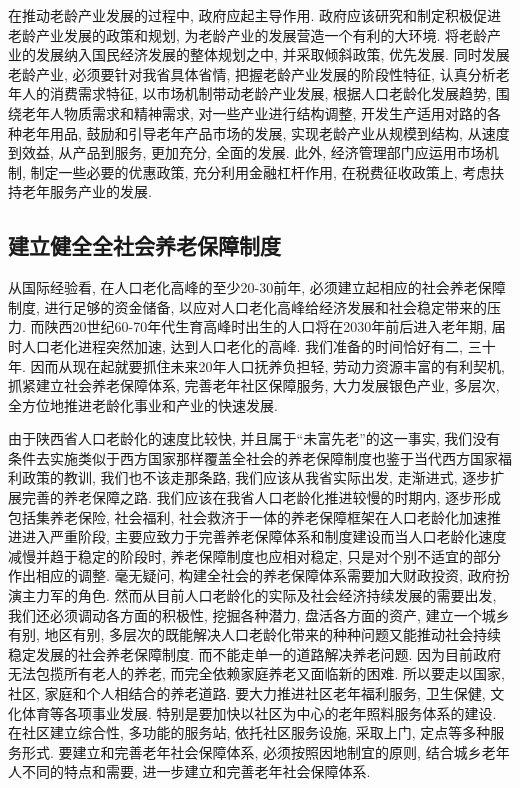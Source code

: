\documentclass[a4paper, 12pt, UTF8]{article}
\begin{document}
在推动老龄产业发展的过程中, 政府应起主导作用. 政府应该研究和制定积极促进老龄产业发展的政策和规划, 为老龄产业的发展营造一个有利的大环境. 将老龄产业的发展纳入国民经济发展的整体规划之中, 并采取倾斜政策, 优先发展. 同时发展老龄产业, 必须要针对我省具体省情, 把握老龄产业发展的阶段性特征, 认真分析老年人的消费需求特征, 以市场机制带动老龄产业发展, 根据人口老龄化发展趋势, 围绕老年人物质需求和精神需求, 对一些产业进行结构调整, 开发生产适用对路的各种老年用品, 鼓励和引导老年产品市场的发展, 实现老龄产业从规模到结构, 从速度到效益, 从产品到服务, 更加充分, 全面的发展. 此外, 经济管理部门应运用市场机制, 制定一些必要的优惠政策, 充分利用金融杠杆作用, 在税费征收政策上, 考虑扶持老年服务产业的发展.

\subsection{建立健全全社会养老保障制度}
从国际经验看, 在人口老化高峰的至少20-30前年, 必须建立起相应的社会养老保障制度, 进行足够的资金储备, 以应对人口老化高峰给经济发展和社会稳定带来的压力. 而陕西20世纪60-70年代生育高峰时出生的人口将在2030年前后进入老年期, 届时人口老化进程突然加速, 达到人口老化的高峰. 我们准备的时间恰好有二, 三十年. 因而从现在起就要抓住未来20年人口抚养负担轻, 劳动力资源丰富的有利契机, 抓紧建立社会养老保障体系, 完善老年社区保障服务, 大力发展银色产业, 多层次, 全方位地推进老龄化事业和产业的快速发展. 

由于陕西省人口老龄化的速度比较快, 并且属于“未富先老”的这一事实, 我们没有条件去实施类似于西方国家那样覆盖全社会的养老保障制度也鉴于当代西方国家福利政策的教训, 我们也不该走那条路, 我们应该从我省实际出发, 走渐进式, 逐步扩展完善的养老保障之路. 我们应该在我省人口老龄化推进较慢的时期内, 逐步形成包括集养老保险, 社会福利, 社会救济于一体的养老保障框架在人口老龄化加速推进进入严重阶段, 主要应致力于完善养老保障体系和制度建设而当人口老龄化速度减慢并趋于稳定的阶段时, 养老保障制度也应相对稳定, 只是对个别不适宜的部分作出相应的调整. 毫无疑问, 构建全社会的养老保障体系需要加大财政投资, 政府扮演主力军的角色. 然而从目前人口老龄化的实际及社会经济持续发展的需要出发, 我们还必须调动各方面的积极性, 挖掘各种潜力, 盘活各方面的资产, 建立一个城乡有别, 地区有别, 多层次的既能解决人口老龄化带来的种种问题又能推动社会持续稳定发展的社会养老保障制度. 而不能走单一的道路解决养老问题. 因为目前政府无法包揽所有老人的养老, 而完全依赖家庭养老又面临新的困难. 所以要走以国家, 社区, 家庭和个人相结合的养老道路. 要大力推进社区老年福利服务, 卫生保健, 文化体育等各项事业发展. 特别是要加快以社区为中心的老年照料服务体系的建设. 在社区建立综合性, 多功能的服务站, 依托社区服务设施, 采取上门, 定点等多种服务形式. 要建立和完善老年社会保障体系, 必须按照因地制宜的原则, 结合城乡老年人不同的特点和需要, 进一步建立和完善老年社会保障体系. 
\end{document}
